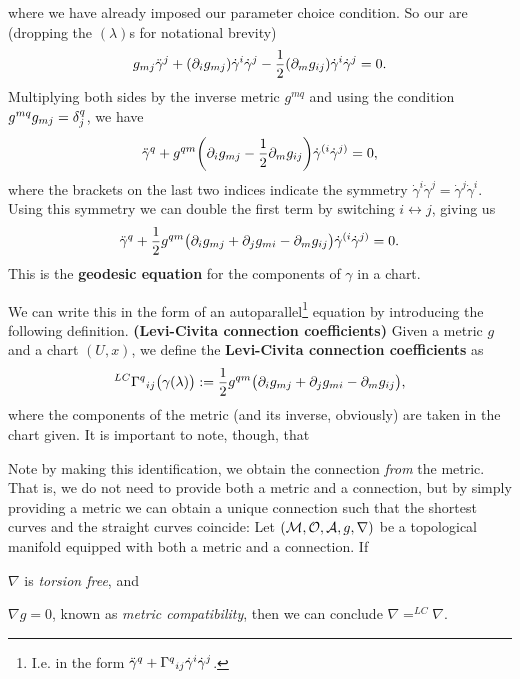 \documentclass[12pt]{article} %
\newcommand{\bfs}[1]{\textbf{({#1}) }}
\begin{document}
where we have already imposed our parameter choice condition. So our  are (dropping the $(\lambda)$s for notational brevity)
\begin{align*}
    g_{mj}\Ddot{\gamma}^j + (\partial_ig_{mj})\dot{\gamma}^i\Dot{\gamma}^j - \frac{1}{2}(\partial_mg_{ij})\Dot{\gamma}^i\Dot{\gamma}^j = 0.
\end{align*}
Multiplying both sides by the inverse metric $g^{mq}$ and using the condition $g^{mq}g_{mj}=\delta^q_j$, we have 
\begin{align*}
    \Ddot{\gamma}^q + g^{qm}\bigg( \partial_ig_{mj} - \frac{1}{2}\partial_mg_{ij}\bigg) \dot{\gamma}^{(i}\dot{\gamma}^{j)} = 0,
\end{align*}
where the brackets on the last two indices indicate the symmetry $\dot{\gamma}^i\dot{\gamma}^j = \dot{\gamma}^j\dot{\gamma}^i$. Using this symmetry we can double the first term by switching $i\leftrightarrow j$, giving us 
\begin{align*}
    \Ddot{\gamma}^q + \frac{1}{2}g^{qm}\big(\partial_ig_{mj}+\partial_jg_{mi} - \partial_mg_{ij}\big)\dot{\gamma}^{(i}\dot{\gamma}^{j)} = 0.
\end{align*}
This is the \textbf{geodesic equation} for the components of $\gamma$ in a chart. 

We can write this in the form of an autoparallel\footnote{I.e. in the form $\Ddot{\gamma}^q + {\Gamma^q}_{ij}\dot{\gamma}^i\dot{\gamma}^j$.} equation by introducing the following definition.
\bd\bfs{Levi-Civita connection coefficients}
    Given a metric $g$ and a chart $(U,x)$, we define the  \textbf{Levi-Civita connection coefficients} as 
    \begin{align*}
        ^{LC}{\Gamma^q}_{ij}\big(\gamma(\lambda)\big) := \frac{1}{2}g^{qm}\big(\partial_ig_{mj}+\partial_jg_{mi} - \partial_mg_{ij}\big),
    \end{align*}
    where the components of the metric (and its inverse, obviously) are taken in the chart given. 
\ed 
It is important to note, though, that 

Note by making this identification, we obtain the connection \textit{from} the metric. That is, we do not need to provide both a metric and a connection, but by simply providing a metric we can obtain a unique connection such that the shortest curves and the  straight curves coincide:
\bt 
    Let $(\mathcal{M},\mathcal{O},\mathcal{A},g,\nabla)$ be a topological manifold equipped with both a metric and a connection. If
    \benr 
        \item $\nabla$ is \textit{torsion free}, and 
        \item $\nabla g = 0$, known as \textit{metric compatibility},
    \een 
    then we can conclude $\nabla = ^{LC}\nabla$.
\et 
\end{document}
